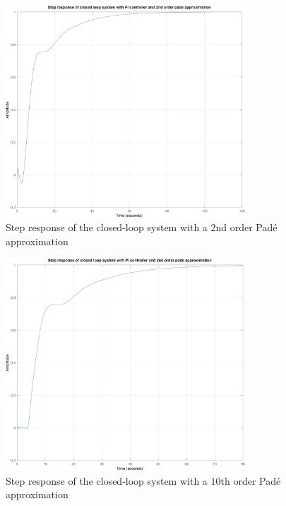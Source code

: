 \begin{figure}[h!]
	\centering
	\includegraphics[width=0.8\textwidth]{Pictures/StepResponse_Pade2.png}
	
	\caption{Step response of the closed-loop system with a $2$nd order Padé approximation}
	\label{fig:StepResponse_Pade2}
\end{figure}


\begin{figure}[h!]
	\centering
	\includegraphics[width=0.8\textwidth]{Pictures/StepResponse_Pade10.png}
	
	\caption{Step response of the closed-loop system with a $10$th order Padé approximation}
	\label{fig:StepResponse_Pade10}
\end{figure}


